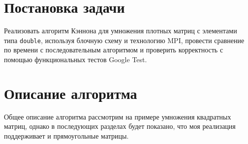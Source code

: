 \documentclass[12pt]{article}
\begin{document}
\section{Постановка задачи}

\hspace*{1.25em} Реализовать алгоритм Кэннона для умножения плотных матриц с элементами типа \texttt{double}, используя блочную схему и технологию MPI, провести сравнение по времени с последовательным алгоритмом и проверить корректность с помощью функциональных тестов Google Test.

\section{Описание алгоритма}

\hspace*{1.25em}Общее описание алгоритма рассмотрим на примере умножения квадратных матриц, однако в последующих разделах будет показано, что моя реализация поддерживает и прямоугольные матрицы.
\end{document}
